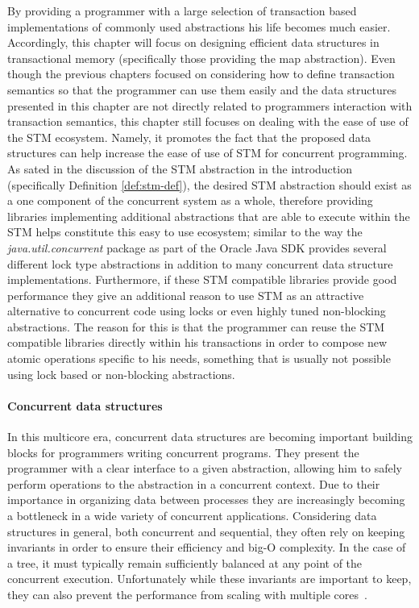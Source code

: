 By providing a programmer with a large selection of transaction based implementations of commonly used abstractions
his life becomes much easier.
Accordingly, this chapter will focus on designing efficient data structures in transactional memory (specifically those providing the map abstraction).
Even though the previous chapters focused on considering how to define transaction semantics so that the programmer can use them easily and
the data structures presented in this chapter are not directly related to programmers interaction with transaction semantics,
this chapter still focuses on dealing with the ease of use of the STM ecosystem.
Namely, it promotes the fact that the proposed data structures can help increase the ease of use of STM for concurrent programming.
As sated in the discussion of the STM abstraction in the introduction (specifically Definition \ref{def:stm-def}), the desired STM abstraction
should exist as a one component of the concurrent system as a whole, therefore providing libraries implementing additional abstractions
that are able to execute within the STM helps constitute this easy to use ecosystem; similar to the way the \emph{java.util.concurrent}
package as part of the Oracle Java SDK \cite{javasdk} provides several different lock type abstractions in addition to many concurrent data structure
implementations.
Furthermore, if these STM compatible libraries provide good performance they give an additional reason to use STM as an attractive alternative to
concurrent code using locks or even highly tuned non-blocking abstractions.
The reason for this is that the programmer can reuse
the STM compatible libraries directly within his transactions in order to compose new atomic operations specific to his needs,
something that is usually not possible using lock based or non-blocking abstractions.


\paragraph{Concurrent data structures}
In this multicore era, concurrent data structures are becoming important building blocks
for programmers writing concurrent programs.
They present the programmer with a clear interface to a given abstraction, allowing
him to safely perform operations to the abstraction in a concurrent context.
Due to their importance in organizing data between processes they are increasingly becoming a bottleneck
in a wide variety of concurrent applications.
Considering data structures in general, both concurrent and sequential, they often rely on keeping invariants
in order to ensure their efficiency and big-O complexity.
In the case of a tree, it must typically remain sufficiently balanced at any point of the concurrent execution.
Unfortunately while these invariants are important to keep, they can also prevent
the performance from scaling with multiple cores~\cite{Sha2011}.

